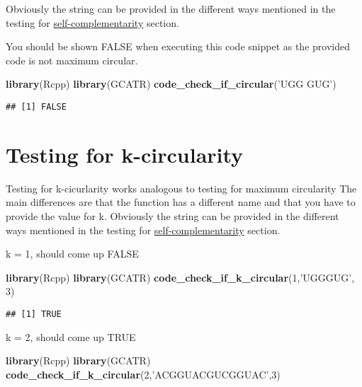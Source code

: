 \documentclass[
]{article}
\newenvironment{Shaded}{\begin{snugshade}}{\end{snugshade}}
\newcommand{\DecValTok}[1]{\textcolor[rgb]{0.00,0.00,0.81}{#1}}
\newcommand{\KeywordTok}[1]{\textcolor[rgb]{0.13,0.29,0.53}{\textbf{#1}}}
\newcommand{\NormalTok}[1]{#1}
\newcommand{\StringTok}[1]{\textcolor[rgb]{0.31,0.60,0.02}{#1}}
\begin{document}
Obviously the string can be provided in the different ways mentioned in
the testing for
\protect\hyperlink{self-complementary}{self-complementarity} section.

You should be shown FALSE when executing this code snippet as the
provided code is not maximum circular.

\begin{Shaded}
\begin{Highlighting}[]
\KeywordTok{library}\NormalTok{(Rcpp)}
\KeywordTok{library}\NormalTok{(GCATR)}
\KeywordTok{code_check_if_circular}\NormalTok{(}\StringTok{'UGG GUG'}\NormalTok{)}
\end{Highlighting}
\end{Shaded}

\begin{verbatim}
## [1] FALSE
\end{verbatim}

\hypertarget{testing-for-k-circularity}{%
\section{Testing for k-circularity}\label{testing-for-k-circularity}}

Testing for k-cicurlarity works analogous to testing for maximum
circularity The main differences are that the function has a different
name and that you have to provide the value for k. Obviously the string
can be provided in the different ways mentioned in the testing for
\protect\hyperlink{self-complementary}{self-complementarity} section.

k = 1, should come up FALSE

\begin{Shaded}
\begin{Highlighting}[]
\KeywordTok{library}\NormalTok{(Rcpp)}
\KeywordTok{library}\NormalTok{(GCATR)}
\KeywordTok{code_check_if_k_circular}\NormalTok{(}\DecValTok{1}\NormalTok{,}\StringTok{'UGGGUG'}\NormalTok{, }\DecValTok{3}\NormalTok{)}
\end{Highlighting}
\end{Shaded}

\begin{verbatim}
## [1] TRUE
\end{verbatim}

k = 2, should come up TRUE

\begin{Shaded}
\begin{Highlighting}[]
\KeywordTok{library}\NormalTok{(Rcpp)}
\KeywordTok{library}\NormalTok{(GCATR)}
\KeywordTok{code_check_if_k_circular}\NormalTok{(}\DecValTok{2}\NormalTok{,}\StringTok{'ACGGUACGUCGGUAC'}\NormalTok{,}\DecValTok{3}\NormalTok{)}
\end{Highlighting}
\end{Shaded}
\end{document}
